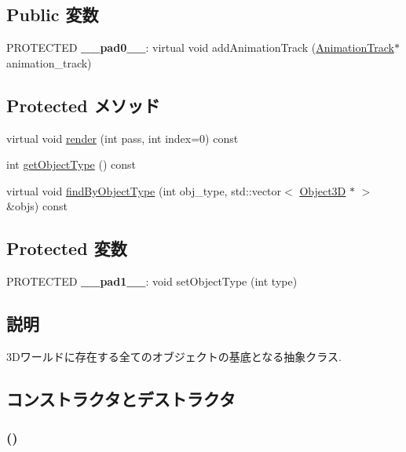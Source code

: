 \subsection*{Public 変数}
\begin{CompactItemize}
\item 
\hypertarget{classm3g_1_1Object3D_11d260eb623ff241a55524ad8bc9beb4}{
PROTECTED \textbf{\_\-\_\-pad0\_\-\_\-}: virtual void addAnimationTrack (\hyperlink{classm3g_1_1AnimationTrack}{AnimationTrack}$\ast$ animation\_\-track)}
\label{classm3g_1_1Object3D_11d260eb623ff241a55524ad8bc9beb4}

\end{CompactItemize}
\subsection*{Protected メソッド}
\begin{CompactItemize}
\item 
virtual void \hyperlink{classm3g_1_1Object3D_1efcb1973989d9963d5bd6d03065d389}{render} (int pass, int index=0) const 
\item 
int \hyperlink{classm3g_1_1Object3D_06be1b37b707b5f227cba2308043f3df}{getObjectType} () const 
\item 
virtual void \hyperlink{classm3g_1_1Object3D_4dadb21b568b0230fac106f15040138c}{findByObjectType} (int obj\_\-type, std::vector$<$ \hyperlink{classm3g_1_1Object3D}{Object3D} $\ast$ $>$ \&objs) const 
\end{CompactItemize}
\subsection*{Protected 変数}
\begin{CompactItemize}
\item 
\hypertarget{classm3g_1_1Object3D_1868c0b310409e4b2258f29504e43760}{
PROTECTED \textbf{\_\-\_\-pad1\_\-\_\-}: void setObjectType (int type)}
\label{classm3g_1_1Object3D_1868c0b310409e4b2258f29504e43760}

\end{CompactItemize}


\subsection{説明}
3Dワールドに存在する全てのオブジェクトの基底となる抽象クラス. 

\subsection{コンストラクタとデストラクタ}
\hypertarget{classm3g_1_1Object3D_f4b10c33b9014a3f0a675ef4b699b773}{
\subsubsection[{Object3D}]{ ()}}
\label{classm3g_1_1Object3D_f4b10c33b9014a3f0a675ef4b699b773}


